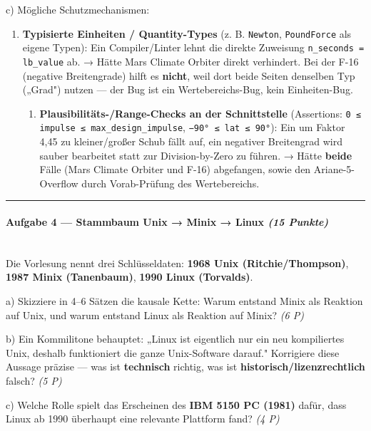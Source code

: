 \documentclass[11pt, a4paper]{article}
\begin{document}
c) Mögliche Schutzmechanismen:

\begin{enumerate}
  \item \textbf{Typisierte Einheiten / Quantity-Types} (z. B. \texttt{Newton}, \texttt{PoundForce} als eigene Typen): Ein Compiler/Linter lehnt die direkte Zuweisung \texttt{n\_seconds = lb\_value} ab. → Hätte Mars Climate Orbiter direkt verhindert. Bei der F-16 (negative Breitengrade) hilft es \textbf{nicht}, weil dort beide Seiten denselben Typ („Grad") nutzen — der Bug ist ein Wertebereichs-Bug, kein Einheiten-Bug.
\begin{enumerate}
  \item \textbf{Plausibilitäts-/Range-Checks an der Schnittstelle} (Assertions: \texttt{0 ≤ impulse ≤ max\_design\_impulse}, \texttt{−90° ≤ lat ≤ 90°}): Ein um Faktor 4,45 zu kleiner/großer Schub fällt auf, ein negativer Breitengrad wird sauber bearbeitet statt zur Division-by-Zero zu führen. → Hätte \textbf{beide} Fälle (Mars Climate Orbiter und F-16) abgefangen, sowie den Ariane-5-Overflow durch Vorab-Prüfung des Wertebereichs.
\end{enumerate}
\end{enumerate}


\noindent\textcolor{rulegray}{\rule{\linewidth}{0.4pt}}


\paragraph{Aufgabe 4 — Stammbaum Unix → Minix → Linux \textit{(15 Punkte)}}\mbox{}\\[2pt]

Die Vorlesung nennt drei Schlüsseldaten: \textbf{1968 Unix (Ritchie/Thompson)}, \textbf{1987 Minix (Tanenbaum)}, \textbf{1990 Linux (Torvalds)}.


a) Skizziere in 4–6 Sätzen die kausale Kette: Warum entstand Minix als Reaktion auf Unix, und warum entstand Linux als Reaktion auf Minix? \textit{(6 P)}


b) Ein Kommilitone behauptet: „Linux ist eigentlich nur ein neu kompiliertes Unix, deshalb funktioniert die ganze Unix-Software darauf." Korrigiere diese Aussage präzise — was ist \textbf{technisch} richtig, was ist \textbf{historisch/lizenzrechtlich} falsch? \textit{(5 P)}


c) Welche Rolle spielt das Erscheinen des \textbf{IBM 5150 PC (1981)} dafür, dass Linux ab 1990 überhaupt eine relevante Plattform fand? \textit{(4 P)}
\end{document}

